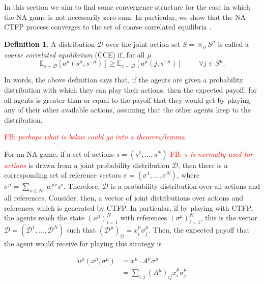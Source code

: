 \documentclass{article}
\theoremstyle{definition}
\newtheorem*{definition}{Definition}
\newcommand{\fb}[1]{\textcolor{red}{FB: \textit{#1}}}
\newcommand{\wmunu}{w^{\mu \nu}}
\newcommand{\xmu}{x^{\mu}}
\newcommand{\refmu}{\sigma^{\mu}}
\begin{document}
  In this section we aim to find some convergence structure for the
  case in which the NA game is not necessarily zero-sum. In
  particular, we show that the NA-CTFP process converges to the set of
  coarse correlated equilibria \cite{}.
  \begin{definition}
    A distribution $\mathcal{D}$ over the joint action set $S =
    \times_\mu S^\mu$ is called a \emph{coarse correlated equilibrium}
    (CCE) if, for all $\mu$
    \begin{equation}
      \mathbb{E}_{s \sim \mathcal{D}}[u^\mu (s^\mu, s^{- \mu})] \geq
      \mathbb{E}_{x \sim \mathcal{D}}[u^\mu (j, s^{-
          \mu})] \hspace{1cm} \forall j \in S^\mu.
    \end{equation}
  \end{definition}

  In words, the above definition says that, if the agents are given a
  probability distribution with which they can play their actions, then
  the expected payoff, for all agents is greater than or equal to the
  payoff that they would get by playing any of their other available
  actions, assuming that the other agents keep to the distribution.

  \fb{perhaps what is below could go into a theorem/lemma.}
  
  For an NA game, if a set of actions $s = (s^1, \ldots, s^N)$ \fb{$s$ is normally used for actions} is
  drawn from a joint probability distribution $\mathcal{D}$, then
  there is a corresponding set of reference vectors $\sigma =
  (\sigma^1, \ldots, \sigma^N)$, where $\sigma^\mu = \sum_{\nu \in
    N^\mu} \wmunu s^\nu$.  Therefore, $\mathcal{D}$ is a probability
  distribution over all actions and all references.  Consider, then, a
  vector of joint distributions over actions and references which is
  generated by CTFP. In particular, if by playing with CTFP, the
  agents reach the state $(\xmu)_{i = 1}^N$ with references
  $(\refmu)_{i = 1}^N$, this is the vector $\mathcal{D} =
  (\mathcal{D}^1, ..., \mathcal{D}^N)$ such that
  $(\mathcal{D}^\mu)_{ij} = \xmu_i \refmu_j$. Then, the expected
  payoff that the agent would receive for playing this strategy is

  \begin{align}
    u^\mu(\xmu, \refmu) & = \xmu \cdot A^\mu \refmu \nonumber \\
    & = \sum_{i, j} (A^\mu)_{ij} \xmu_i \refmu_j \nonumber 
  \end{align}
\end{document}
